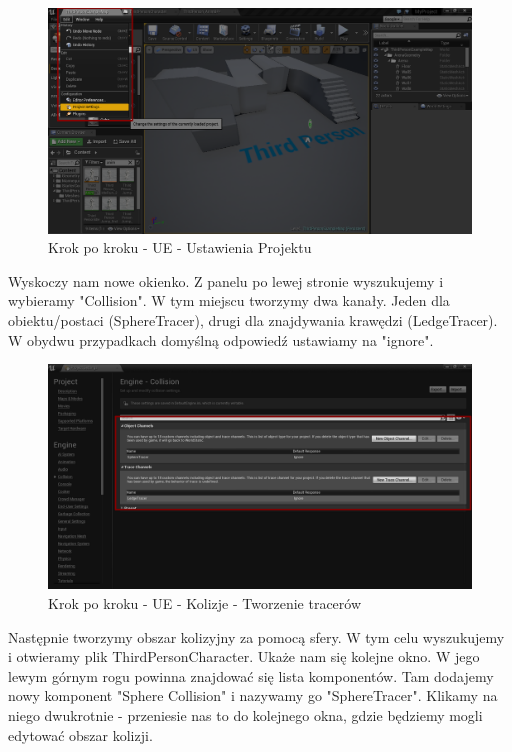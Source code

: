 \documentclass[brudnopis]{xmgr}
\begin{document}
\begin{figure}[!htb]
    \begin{center}
    \includegraphics[scale=0.35]{Screeny/UeKrokPoKroku/UE-Climb-ProjectSettings.png}
    \end{center}
    \caption{Krok po kroku - UE - Ustawienia Projektu}
\end{figure}

Wyskoczy nam nowe okienko. Z panelu po lewej stronie wyszukujemy i wybieramy "Collision". W tym miejscu tworzymy dwa kanały. Jeden dla obiektu/postaci (SphereTracer), drugi dla znajdywania krawędzi (LedgeTracer). W obydwu przypadkach domyślną odpowiedź ustawiamy na "ignore".

\begin{figure}[!htb]
    \begin{center}
    \includegraphics[scale=0.35]{Screeny/UeKrokPoKroku/UE-Climb-Collision.png}
    \end{center}
    \caption{Krok po kroku - UE -  Kolizje - Tworzenie tracerów}
\end{figure}

Następnie tworzymy obszar kolizyjny za pomocą sfery. W tym celu wyszukujemy i otwieramy plik ThirdPersonCharacter. Ukaże nam się kolejne okno. W jego lewym górnym rogu powinna znajdować się lista komponentów. Tam dodajemy nowy komponent "Sphere Collision" i nazywamy go "SphereTracer". Klikamy na niego dwukrotnie - przeniesie nas to do kolejnego okna, gdzie będziemy mogli edytować obszar kolizji.
\end{document}
